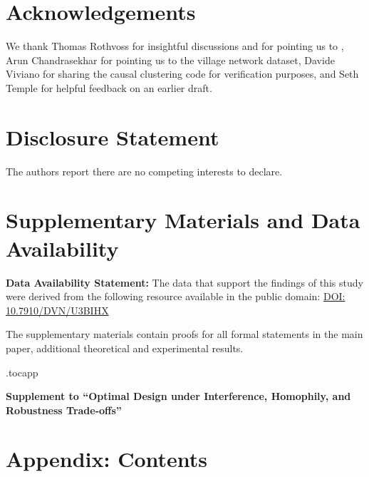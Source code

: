 \documentclass[12pt]{article}
\theoremstyle{definition}
\numberwithin{equation}{section}
\numberwithin{figure}{section}
\renewcommand*\contentsname{Table of contents}
\numberwithin{equation}{section}
\numberwithin{figure}{section}
\begin{document}
\section{Acknowledgements}
We thank Thomas Rothvoss for insightful discussions and for pointing us to \citet{raghavendra2012approximating}, Arun Chandrasekhar for pointing us to the village network dataset, Davide Viviano for sharing the causal clustering code for verification purposes, and Seth Temple for helpful feedback on an earlier draft.

\section{Disclosure Statement}
The authors report there are no competing interests to declare.

\section{Supplementary Materials and Data Availability}
\textbf{Data Availability Statement:} The data that support the findings of this study were derived from the following resource available in the public domain: \href{https://doi.org/10.7910/DVN/U3BIHX}{DOI: 10.7910/DVN/U3BIHX}

The supplementary materials contain proofs for all formal statements in the main paper, additional theoretical and experimental results. 


\newpage
\appendix
\etocdepthtag.toc{app}

\begin{center}
{\large\bf Supplement to ``Optimal Design under Interference, Homophily, and Robustness Trade-offs''} \\

\end{center}

\section*{Appendix: Contents}


\begingroup
    \renewcommand{\contentsname}{} %
  \tableofcontents
\endgroup
\end{document}
